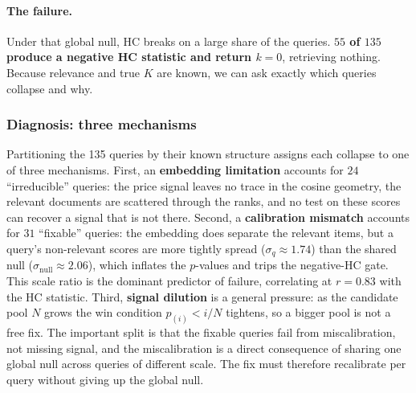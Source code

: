 \documentclass[letterpaper]{article} %
\newcommand{\AmFailN}{55}\newcommand{\AmTotN}{135}
\newcommand{\AmIrrN}{24}\newcommand{\AmFixN}{31}\newcommand{\AmPosN}{77}
\newcommand{\AmSigQ}{1.74}\newcommand{\AmSigNull}{2.06}\newcommand{\AmStdCorr}{0.83}
\begin{document}
\paragraph{The failure.} Under that global null, HC breaks on a large
share of the queries. \textbf{$\AmFailN$ of $\AmTotN$ produce a negative
HC statistic and return $k{=}0$}, retrieving nothing. Because relevance
and true $K$ are known, we can ask exactly which queries collapse and
why.

\subsubsection{Diagnosis: three mechanisms}
Partitioning the 135 queries by their known structure assigns each
collapse to one of three mechanisms. First, an \textbf{embedding
limitation} accounts for $\AmIrrN$ ``irreducible'' queries: the price
signal leaves no trace in the cosine geometry, the relevant documents are
scattered through the ranks, and no test on these scores can recover a
signal that is not there. Second, a \textbf{calibration mismatch}
accounts for $\AmFixN$ ``fixable'' queries: the embedding does separate
the relevant items, but a query's non-relevant scores are more tightly
spread ($\sigma_q{\approx}\AmSigQ$) than the shared null
($\sigma_{\mathrm{null}}{\approx}\AmSigNull$), which inflates the
$p$-values and trips the negative-HC gate. This scale ratio is the
dominant predictor of failure, correlating at $r{=}\AmStdCorr$ with the
HC statistic. Third, \textbf{signal dilution} is a general pressure: as
the candidate pool $N$ grows the win condition $p_{(i)}<i/N$ tightens, so
a bigger pool is not a free fix. The important split is that the fixable
queries fail from miscalibration, not missing signal, and the
miscalibration is a direct consequence of sharing one global null across
queries of different scale. The fix must therefore recalibrate per query
without giving up the global null.
\end{document}
